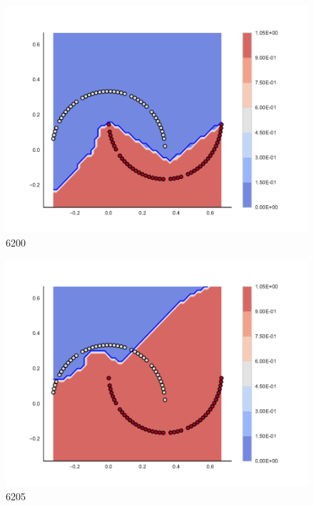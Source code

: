 \begin{subfigure}[b]{0.12\textwidth}
    \includegraphics[clip, trim=2.35cm 1.75cm 4.5cm 0cm,width=\textwidth]{img/convergence/6200.pdf}
    \caption{6200}
    \label{fig:convergence_6200}
\end{subfigure}
%
\begin{subfigure}[b]{0.12\textwidth}
    \includegraphics[clip, trim=2.35cm 1.75cm 4.5cm 0cm,width=\textwidth]{img/convergence/6205.pdf}
    \caption{6205}
    \label{fig:convergence_6205}
\end{subfigure}
%
